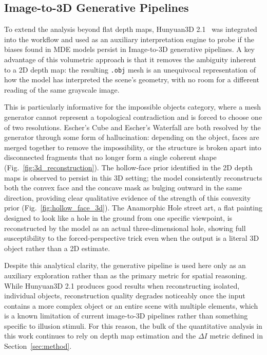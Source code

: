 \documentclass[10pt,twocolumn]{article}
\begin{document}
\subsection{Image-to-3D Generative Pipelines}

To extend the analysis beyond flat depth maps, Hunyuan3D 2.1~\cite{hunyuan3d} was
integrated into the workflow and used as an auxiliary interpretation engine to probe if the biases found in MDE models persist in Image-to-3D generative pipelines. A key advantage of this volumetric approach is that it removes the
ambiguity inherent to a 2D depth map: the resulting \texttt{.obj} mesh is an unequivocal
representation of how the model has interpreted the scene's geometry, with no room for
a different reading of the same grayscale image.

This is particularly informative for the impossible objects category, where a mesh
generator cannot represent a topological contradiction and is forced to choose one of
two resolutions. Escher's Cube and Escher's Waterfall are both resolved by the generator
through some form of hallucination: depending on the object, faces are merged together
to remove the impossibility, or the structure is broken apart into disconnected fragments
that no longer form a single coherent shape (Fig.~\ref{fig:3d_reconstruction}). The hollow-face prior identified in the 2D depth maps is observed to persist in this 3D setting; the model consistently reconstructs both the convex face and the concave mask as bulging outward in the same direction, providing clear qualitative evidence of the strength of this convexity prior (Fig.~\ref{fig:hollow_face_3d}). The Anamorphic Hole street art, a flat painting designed to look
like a hole in the ground from one specific viewpoint, is reconstructed by the model as
an actual three-dimensional hole, showing full susceptibility to the forced-perspective
trick even when the output is a literal 3D object rather than a 2D estimate.

Despite this analytical clarity, the generative pipeline is used here only as an auxiliary exploration rather than as the primary metric for spatial reasoning. While Hunyuan3D 2.1
produces good results when reconstructing isolated, individual objects, reconstruction
quality degrades noticeably once the input contains a more complex object or an entire
scene with multiple elements, which is a known limitation of current image-to-3D
pipelines rather than something specific to illusion stimuli. For this reason, the bulk of
the quantitative analysis in this work continues to rely on depth map estimation and the
$\Delta I$ metric defined in Section~\ref{sec:method}.
\end{document}
